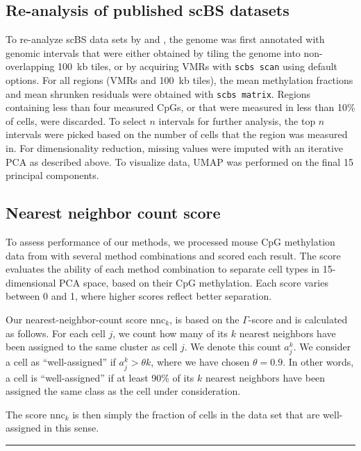 \documentclass[twocolumn,10pt]{article}
\begin{document}
\subsection{Re-analysis of published scBS datasets}
To re-analyze scBS data sets by \citet{luo2017single} and \citet{argelaguet2019gastru}, the genome was first annotated with genomic intervals that were either obtained by tiling the genome into non-overlapping 100~kb tiles, or by acquiring VMRs with \texttt{scbs scan} using default options. For all regions (VMRs and 100~kb tiles), the mean methylation fractions and mean shrunken residuals were obtained with \texttt{scbs matrix}. Regions containing less than four measured CpGs, or that were measured in less than 10\% of cells, were discarded. To select $n$ intervals for further analysis, the top $n$ intervals were picked based on the number of cells that the region was measured in. 
For dimensionality reduction, missing values were imputed with an iterative PCA as described above. To visualize data, UMAP was performed on the final 15 principal components.

\subsection{Nearest neighbor count score}
To assess performance of our methods, we processed mouse CpG methylation data from \citet{luo2017single} with several method combinations and scored each result. The score evaluates the ability of each method combination to separate cell types in 15-dimensional PCA space, based on their CpG methylation. Each score varies between 0 and 1, where higher scores reflect better separation.

Our nearest-neighbor-count score $\text{nnc}_k$, is based on the $\Gamma$-score \citep{Kireeva_2014} and is calculated as follows. For each cell $j$, we count how many of its $k$ nearest neighbors have been assigned to the same cluster as cell $j$. We denote this count $a^k_j$. We consider a cell as ``well-assigned'' if $a^k_j>\theta k$, where we have chosen $\theta=0.9$. In other words, a cell is ``well-assigned'' if at least 90\% of its $k$ nearest neighbors have been assigned the same class as the cell under consideration.

The score $\text{nnc}_k$ is then simply the fraction of cells in the data set that are well-assigned in this sense.

\vspace{1.4ex}
\noindent\hfil\rule{.6\columnwidth}{.2pt}\hfil


{\small }
\end{document}
